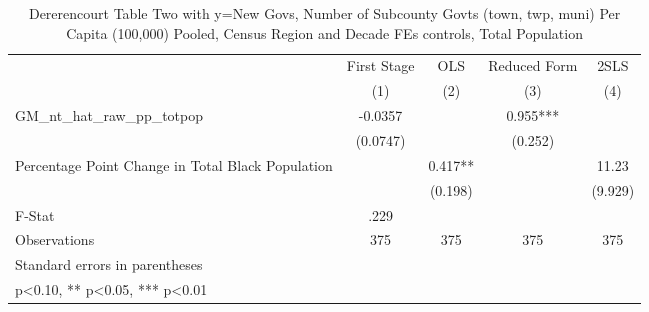 \begin{table}[htbp]\centering
\def\sym#1{\ifmmode^{#1}\else\(^{#1}\)\fi}
\caption{Dererencourt Table Two with y=New Govs, Number of Subcounty Govts (town, twp, muni) Per Capita (100,000) Pooled, Census Region and Decade FEs controls, Total Population}
\begin{tabular}{l*{4}{c}}
\toprule
                    & First Stage   &         OLS   &Reduced Form   &        2SLS   \\
                    &\multicolumn{1}{c}{(1)}   &\multicolumn{1}{c}{(2)}   &\multicolumn{1}{c}{(3)}   &\multicolumn{1}{c}{(4)}   \\
\midrule
GM\_nt\_hat\_raw\_pp\_totpop&     -0.0357   &               &       0.955***&               \\
                    &    (0.0747)   &               &     (0.252)   &               \\
\addlinespace
Percentage Point Change in Total Black Population&               &       0.417** &               &       11.23   \\
                    &               &     (0.198)   &               &     (9.929)   \\
\midrule
F-Stat              &        .229   &               &               &               \\
Observations        &         375   &         375   &         375   &         375   \\
\bottomrule
\multicolumn{5}{l}{\footnotesize Standard errors in parentheses}\\
\multicolumn{5}{l}{\footnotesize * p<0.10, ** p<0.05, *** p<0.01}\\
\end{tabular}
\end{table}

